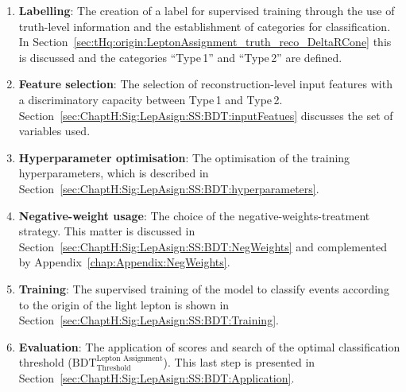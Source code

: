 \begin{enumerate}
	\item \textbf{Labelling}: The creation of a label for supervised training through the use of truth-level 
		information and the establishment of categories for classification. In 
		Section~\ref{sec:tHq:origin:LeptonAssignment_truth_reco_DeltaRCone}
		this is discussed and the categories ``Type$\,$1'' and ``Type$\,$2'' are defined.
		
	\item \textbf{Feature selection}: The selection of reconstruction-level 
		input features with a discriminatory capacity between Type$\,$1 
		and Type$\,$2. %
		Section~\ref{sec:ChaptH:Sig:LepAsign:SS:BDT:inputFeatues} discusses the set of variables used.
		
	\item \textbf{Hyperparameter optimisation}: The optimisation of the training 
		hyperparameters, which is described 
		in Section~\ref{sec:ChaptH:Sig:LepAsign:SS:BDT:hyperparameters}.
	
	\item \textbf{Negative-weight usage}: The choice of the negative-weights-treatment strategy. 
		This matter is discussed 
		in Section~\ref{sec:ChaptH:Sig:LepAsign:SS:BDT:NegWeights} and complemented
		by Appendix~\ref{chap:Appendix:NegWeights}.
	
	\item \textbf{Training}: The supervised training of the model to classify events according
		to the origin of the light lepton is shown in 
		Section~\ref{sec:ChaptH:Sig:LepAsign:SS:BDT:Training}.

	\item \textbf{Evaluation}: The application of scores and search 
		of the optimal classification threshold ($\text{BDT}_{\text{Threshold}}^{\text{Lepton Assignment}}$). 
		This last step is presented in Section~\ref{sec:ChaptH:Sig:LepAsign:SS:BDT:Application}.
\end{enumerate}



